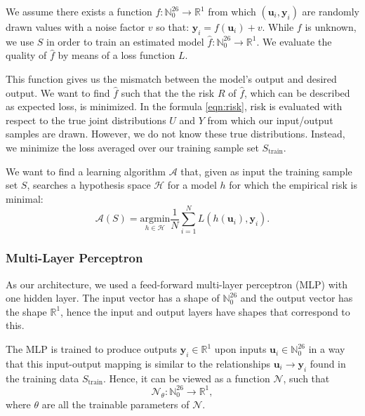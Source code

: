 We assume there exists a function $f : \mathbb{N}_0^{26} \rightarrow \mathbb{R}^{1}$ from which $(\textbf{u}_i, \textbf{y}_i)$ are randomly drawn values with a noise factor $v$ so that: $\textbf{y}_i = f(\textbf{u}_i) + v$. While $f$ is unknown, we use $S$ in order to train an estimated model $\hat{f} : \mathbb{N}_0^{26} \rightarrow \mathbb{R}^{1}$. We evaluate the quality of $\hat{f}$ by means of a loss function $L$.

This function gives us the mismatch between the model's output and desired output. We want to find $\hat{f}$ such that the the risk $R$ of $\hat{f}$, which can be described as expected loss, is minimized. In the formula \ref{eqn:risk}, risk is evaluated with respect to the true joint distributions $U$ and $Y$ from which our input/output samples are drawn. However, we do not know these true distributions. Instead, we minimize the loss averaged over our training sample set $S_{\text{train}}$.

We want to find a learning algorithm $\mathcal{A}$ that, given as input the training sample set $S$, searches a hypothesis space $\mathcal{H}$ for a model $h$ for which the empirical risk is minimal:
\begin{equation}
    \mathcal{A}(S) = \underset{h \in \mathcal{H}}{\text{argmin}} \frac{1}{N} \sum^{N}_{i=1} L(h(\textbf{u}_i), \textbf{y}_i).
\end{equation}

\subsubsection{Multi-Layer Perceptron}

As our architecture, we used a feed-forward multi-layer perceptron (MLP) with one hidden layer. The input vector has a shape of $\mathbb{N}_0^{26}$ and the output vector has the shape $\mathbb{R}^1$, hence the input and output layers have shapes that correspond to this.

The MLP is trained to produce outputs $\textbf{y}_i \in \mathbb{R}^1$ upon inputs $\textbf{u}_i \in \mathbb{N}_0^{26}$ in a way that this input-output mapping is similar to the relationships $\textbf{u}_i \rightarrow \textbf{y}_i$ found in the training data $S_{\text{train}}$. Hence, it can be viewed as a function $\mathcal{N}$, such that
\begin{equation}
    \mathcal{N}_\theta : \mathbb{N}_0^{26} \rightarrow \mathbb{R}^1,
\end{equation}
where $\theta$ are all the trainable parameters of $\mathcal{N}$.

